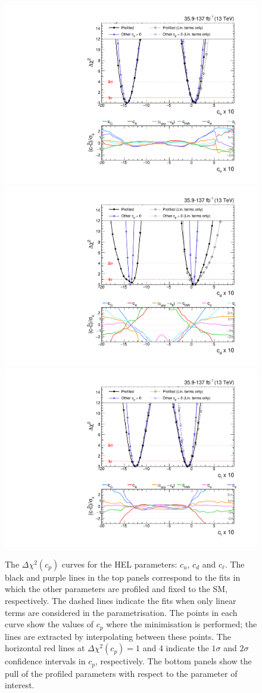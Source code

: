 
\begin{figure}
  \centering
  \includegraphics[width=.49\textwidth]{Figures/eft/chi2/observed/cu.pdf}
  \includegraphics[width=.49\textwidth]{Figures/eft/chi2/observed/cd.pdf}
  \includegraphics[width=.49\textwidth]{Figures/eft/chi2/observed/cl.pdf}
  \caption[Simplified HEL re-interpretation: $c_u$, $c_d$ and $c_{\ell}$]
  {
    The $\Delta\chi^2(c_p)$ curves for the HEL parameters: $c_u$, $c_d$ and $c_\ell$. The black and purple lines in the top panels correspond to the fits in which the other parameters are profiled and fixed to the SM, respectively. The dashed lines indicate the fits when only linear terms are considered in the parametrisation. The points in each curve show the values of $c_p$ where the minimisation is performed; the lines are extracted by interpolating between these points. The horizontal red lines at $\Delta\chi^2(c_p)=1$ and 4 indicate the $1\sigma$ and $2\sigma$ confidence intervals in $c_p$, respectively. The bottom panels show the pull of the profiled parameters with respect to the parameter of interest. 
}
\end{figure}
